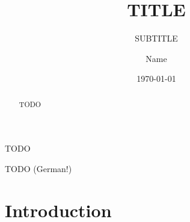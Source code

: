\documentclass{seal_thesis}
\date{\today}
\title{TITLE}
\subtitle{SUBTITLE}
\author{Name}
\begin{document}
\maketitle

\frontmatter

\begin{acknowledgements}
TODO
\end{acknowledgements}

\begin{abstract}
TODO
\end{abstract}

\begin{zusammenfassung}
TODO (German!)
\end{zusammenfassung}

\tableofcontents
\listoffigures
\listoftables

\mainmatter

\chapter{Introduction}
  
\end{document}
